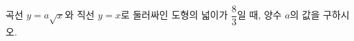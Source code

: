 \hspace*{2mm}\begin{minipage}[t]{\dimexpr\linewidth-2mm\relax}\vspace{0pt}
곡선 $y=a\sqrt{x}$와 직선 $y=x$로 둘러싸인 도형의 넓이가 $\dfrac{8}{3}$일 때, 양수 $a$의 값을 구하시오.\end{minipage}
